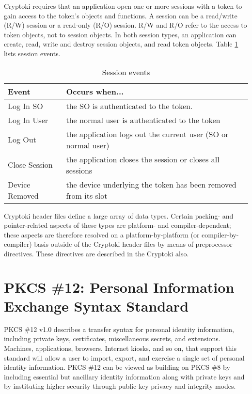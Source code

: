 \documentclass{article}
\begin{document}
Cryptoki requires that an application open one or more sessions with 
a token to gain access to the token's objects and functions.  
A session can be a read/write (R/W) session or a read-only (R/O) session.  
R/W and R/O refer to the access to token objects, not to session objects.  
In both session types, an application can create, read, write and 
destroy session objects, and read token objects.  
Table \ref{kievents} lists session events.
\begin{center}
\begin{table}[htb]
\caption{Session events}
\label{kievents}
\begin{center}\begin{tabular}{|l|l|}\hline
Event  & Occurs when...\\ \hline
Log In SO  &     the SO is authenticated to the token.\\ \hline
Log In User &    the normal user is authenticated to the token\\ \hline
Log Out & the application logs out the current user (SO or normal user)
   \\ \hline
Close Session  &  the application closes the session or closes all sessions
   \\ \hline
Device Removed & the device underlying the token has been removed from 
its slot\\ \hline
\end{tabular}\end{center}
\end{table}
\end{center}

Cryptoki header files define a large array of data types. 
Certain packing- and pointer-related aspects of these types are platform- 
and compiler-dependent; these aspects are therefore resolved on a 
platform-by-platform (or compiler-by-compiler) basis outside of 
the Cryptoki header files by means of preprocessor directives.
These directives are described in the Cryptoki also.

\section{PKCS \#12: Personal Information Exchange Syntax Standard}
\label{pkcs12}
PKCS \#12 v1.0 describes a transfer syntax for personal identity 
information, including private keys, certificates, miscellaneous 
secrets, and extensions.  Machines, applications, browsers, Internet 
kiosks, and so on, that support this standard will allow a user to 
import, export, and exercise a single set of personal identity information.
PKCS \#12 can be viewed as building on PKCS \#8 by including 
essential but ancillary identity information along with private 
keys and by instituting higher security through public-key privacy 
and integrity modes.
\end{document}
